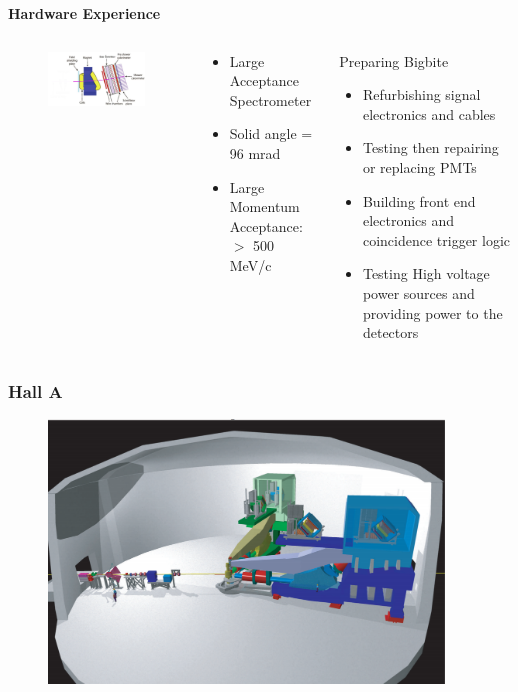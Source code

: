 \documentclass[12pt]{beamer}
\begin{document}
\begin{frame}
\centering 
\textbf{Hardware Experience}
\begin{columns}
	
	\begin{figure}
		\hspace*{-1.4cm}	\includegraphics[width=7cm]{../images/Thesis/BigBite1.png}
	\end{figure}
	\begin{block}{}
		\begin{itemize}
			\item[] Large Acceptance Spectrometer
			\item Solid angle = 96 mrad
			\item Large Momentum Acceptance: $>$ 500 MeV/c
		\end{itemize}
	\end{block}
	
	\hspace*{0.5cm}
	\begin{block}{Preparing Bigbite}
		\begin{itemize}
			\item Refurbishing signal electronics and cables
			\item Testing then repairing or replacing PMTs
			\item Building front end electronics and coincidence trigger logic
			\item Testing High voltage power sources and providing power to the detectors
		\end{itemize}
	\end{block}
\end{columns}
\end{frame}

\begin{frame}
\frametitle{Hall A}
\begin{figure}
	\includegraphics[width=10.5cm]{../images/halla.pdf}
\end{figure}
\end{frame}
\end{document}
